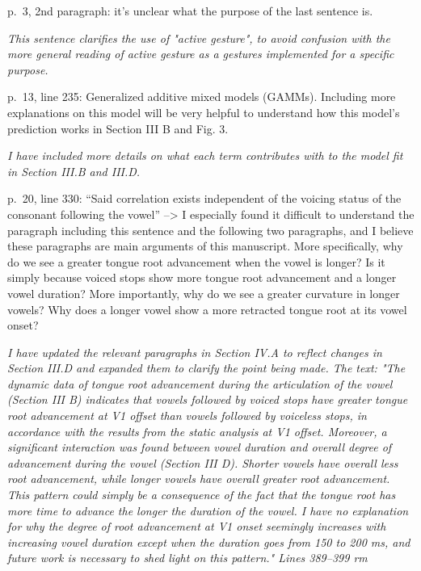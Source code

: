 \documentclass[]{article}
\begin{document}
p.~3, 2nd paragraph: it's unclear what the purpose of the last sentence
is.

\begin{adjustwidth}{1cm}{} \textit{
This sentence clarifies the use of "active gesture", to avoid confusion with the more general reading of active gesture as a gestures implemented for a specific purpose.
} \end{adjustwidth}

p.~13, line 235: Generalized additive mixed models (GAMMs). Including
more explanations on this model will be very helpful to understand how
this model's prediction works in Section III B and Fig. 3.

\begin{adjustwidth}{1cm}{} \textit{
I have included more details on what each term contributes with to the model fit in Section III.B and III.D.
} \end{adjustwidth}

p.~20, line 330: ``Said correlation exists independent of the voicing
status of the consonant following the vowel'' --\textgreater{} I
especially found it difficult to understand the paragraph including this
sentence and the following two paragraphs, and I believe these
paragraphs are main arguments of this manuscript. More specifically, why
do we see a greater tongue root advancement when the vowel is longer? Is
it simply because voiced stops show more tongue root advancement and a
longer vowel duration? More importantly, why do we see a greater
curvature in longer vowels? Why does a longer vowel show a more
retracted tongue root at its vowel onset?

\begin{adjustwidth}{1cm}{} \textit{
I have updated the relevant paragraphs in Section IV.A to reflect changes in Section III.D and expanded them to clarify the point being made. The text: "The dynamic data of tongue root advancement during the articulation of the vowel (Section III B) indicates that vowels followed by voiced stops have greater tongue root advancement at V1 offset than vowels followed by voiceless stops, in accordance with the results from the static analysis at V1 offset. Moreover, a significant interaction was found between vowel duration and overall degree of advancement during the vowel (Section III D). Shorter vowels have overall less root advancement, while longer vowels have overall greater root advancement. This pattern could simply be a consequence of the fact that the tongue root has more time to advance the longer the duration of the vowel. I have no explanation for why the degree of root advancement at V1 onset seemingly increases with increasing vowel duration except when the duration goes from 150 to 200 ms, and future work is necessary to shed light on this pattern." Lines 389--399 rm
} \end{adjustwidth}
\end{document}
